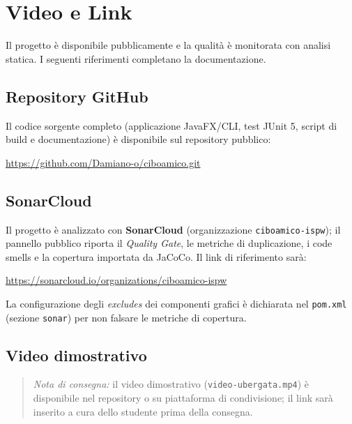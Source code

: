 \chapter{Video e Link}
\label{cap:links}

Il progetto è disponibile pubblicamente e la qualità è monitorata con
analisi statica. I seguenti riferimenti completano la documentazione.

\section{Repository GitHub}
Il codice sorgente completo (applicazione JavaFX/CLI, test JUnit 5, script
di build e documentazione) è disponibile sul repository pubblico:
\begin{center}
\url{https://github.com/Damiano-o/ciboamico.git}
\end{center}

\section{SonarCloud}
Il progetto è analizzato con \textbf{SonarCloud} (organizzazione
\texttt{ciboamico-ispw}); il pannello pubblico riporta il \emph{Quality
Gate}, le metriche di duplicazione, i code smells e la copertura importata da
JaCoCo. Il link di riferimento sarà:
\begin{center}
\url{https://sonarcloud.io/organizations/ciboamico-ispw}
\end{center}
La configurazione degli \emph{excludes} dei componenti grafici è dichiarata
nel \texttt{pom.xml} (sezione \texttt{sonar}) per non falsare le metriche di
copertura.

\section{Video dimostrativo}
\begin{quote}
\emph{Nota di consegna:} il video dimostrativo (\texttt{video-ubergata.mp4}) è
disponibile nel repository o su piattaforma di condivisione; il link sarà
inserito a cura dello studente prima della consegna.
\end{quote}